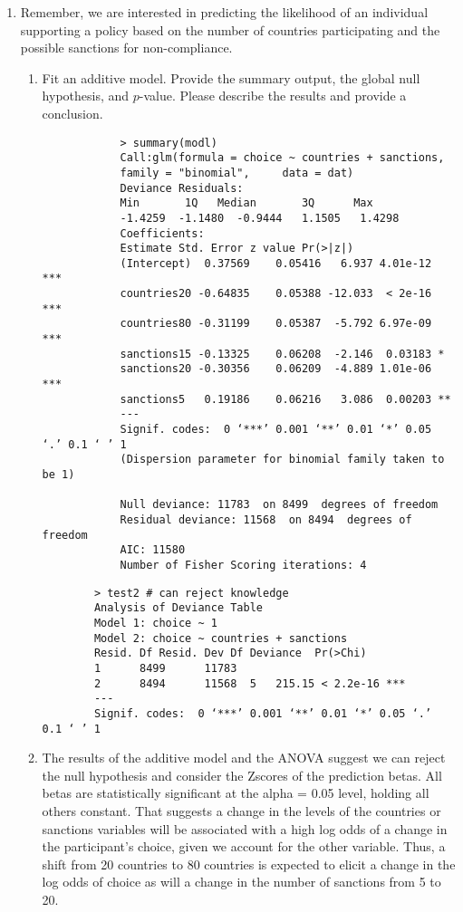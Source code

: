\documentclass[12pt,letterpaper]{article}
\begin{document}
\begin{enumerate}
	\item
	Remember, we are interested in predicting the likelihood of an individual supporting a policy based on the number of countries participating and the possible sanctions for non-compliance.
	\begin{enumerate}
		\item [] Fit an additive model. Provide the summary output, the global null hypothesis, and $p$-value. Please describe the results and provide a conclusion.
		
		
		\begin{verbatim}
			> summary(modl)
			Call:glm(formula = choice ~ countries + sanctions, 
			family = "binomial",     data = dat)
			Deviance Residuals:     
			Min       1Q   Median       3Q      Max 
			-1.4259  -1.1480  -0.9444   1.1505   1.4298  
			Coefficients:            
			Estimate Std. Error z value Pr(>|z|)    
			(Intercept)  0.37569    0.05416   6.937 4.01e-12 ***
			countries20 -0.64835    0.05388 -12.033  < 2e-16 ***
			countries80 -0.31199    0.05387  -5.792 6.97e-09 ***
			sanctions15 -0.13325    0.06208  -2.146  0.03183 *  
			sanctions20 -0.30356    0.06209  -4.889 1.01e-06 ***
			sanctions5   0.19186    0.06216   3.086  0.00203 ** 
			---
			Signif. codes:  0 ‘***’ 0.001 ‘**’ 0.01 ‘*’ 0.05 ‘.’ 0.1 ‘ ’ 1
			(Dispersion parameter for binomial family taken to be 1)    
			
			Null deviance: 11783  on 8499  degrees of freedom
			Residual deviance: 11568  on 8494  degrees of freedom
			AIC: 11580
			Number of Fisher Scoring iterations: 4
		\end{verbatim}
	\begin{verbatim}
		> test2 # can reject knowledge 
		Analysis of Deviance Table
		Model 1: choice ~ 1
		Model 2: choice ~ countries + sanctions  
		Resid. Df Resid. Dev Df Deviance  Pr(>Chi)
		1      8499      11783                          
		2      8494      11568  5   215.15 < 2.2e-16 ***
		---
		Signif. codes:  0 ‘***’ 0.001 ‘**’ 0.01 ‘*’ 0.05 ‘.’ 0.1 ‘ ’ 1
	\end{verbatim}
	\item The results of the additive model and the ANOVA suggest we can reject the null hypothesis and consider the Zscores of the prediction betas. All betas are statistically significant at the alpha = 0.05 level, holding all others constant. That suggests a change in the levels of the countries or sanctions variables will be associated with a high log odds of a change in the participant's choice, given we account for the other variable. Thus, a shift from 20 countries to 80 countries is expected to elicit a change in the log odds of choice as will a change in the number of sanctions from 5 to 20.
		

\end{enumerate}
\end{enumerate}
\end{document}
